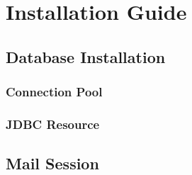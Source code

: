 \section{Installation Guide}
\subsection{Database Installation}
\subsubsection{Connection Pool}
\subsubsection{JDBC Resource}
\subsection{Mail Session}